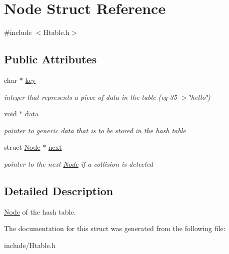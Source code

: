 \hypertarget{struct_node}{}\section{Node Struct Reference}
\label{struct_node}


{\ttfamily \#include $<$Htable.\+h$>$}

\subsection*{Public Attributes}
\begin{DoxyCompactItemize}
\item 
\mbox{\label{struct_node_ad88c9a757bfafd5ff265e0837b150056}} 
char $\ast$ \mbox{\hyperlink{struct_node_ad88c9a757bfafd5ff265e0837b150056}{key}}
\begin{DoxyCompactList}\small\item\em integer that represents a piece of data in the table (eg 35-\/$>$\char`\"{}hello\char`\"{}) \end{DoxyCompactList}\item 
\mbox{\label{struct_node_a38b733496e3eff5e0b4fcb11cd9b866a}} 
void $\ast$ \mbox{\hyperlink{struct_node_a38b733496e3eff5e0b4fcb11cd9b866a}{data}}
\begin{DoxyCompactList}\small\item\em pointer to generic data that is to be stored in the hash table \end{DoxyCompactList}\item 
\mbox{\label{struct_node_af67b110ca1a258b793bf69d306929b22}} 
struct \mbox{\hyperlink{struct_node}{Node}} $\ast$ \mbox{\hyperlink{struct_node_af67b110ca1a258b793bf69d306929b22}{next}}
\begin{DoxyCompactList}\small\item\em pointer to the next \mbox{\hyperlink{struct_node}{Node}} if a collision is detected \end{DoxyCompactList}\end{DoxyCompactItemize}


\subsection{Detailed Description}
\mbox{\hyperlink{struct_node}{Node}} of the hash table. 

The documentation for this struct was generated from the following file\+:\begin{DoxyCompactItemize}
\item 
include/Htable.\+h\end{DoxyCompactItemize}
